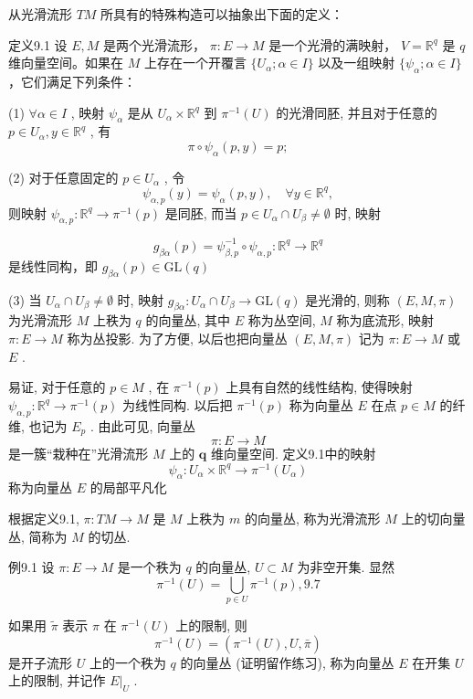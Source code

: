 从光滑流形  $TM$  所具有的特殊构造可以抽象出下面的定义：

定义9.1 设  $E, M$  是两个光滑流形， $\pi : E \to M$  是一个光滑的满映射， $V = \mathbb{R}^q$  是  $q$  维向量空间。如果在  $M$  上存在一个开覆言  $\{U_\alpha; \alpha \in I\}$  以及一组映射  $\{\psi_\alpha; \alpha \in I\}$ ，它们满足下列条件：

(1)  $\forall \alpha \in I$ , 映射  $\psi_{\alpha}$  是从  $U_{\alpha} \times \mathbb{R}^{q}$  到  $\pi^{-1}(U)$  的光滑同胚, 并且对于任意的  $p \in U_{\alpha}, y \in \mathbb{R}^{q}$ , 有
$$
\pi \circ \psi_ {\alpha} (p, y) = p;
$$

(2) 对于任意固定的  $p \in U_{\alpha}$ , 令
$$
\psi_ {\alpha , p} (y) = \psi_ {\alpha} (p, y), \quad \forall y \in \mathbb {R} ^ {q},
$$
则映射  $\psi_{\alpha ,p}:\mathbb{R}^q\to \pi^{-1}(p)$  是同胚, 而当  $p\in U_{\alpha}\cap U_{\beta}\neq \emptyset$  时, 映射

$$
g _ {\beta \alpha} (p) = \psi_ {\beta , p} ^ {- 1} \circ \psi_ {\alpha , p}: \mathbb {R} ^ {q} \rightarrow \mathbb {R} ^ {q}
$$
是线性同构，即  $g_{\beta \alpha}(p)\in \mathrm{GL}(q)$

(3) 当  $U_{\alpha} \cap U_{\beta} \neq \emptyset$  时, 映射  $g_{\beta \alpha}: U_{\alpha} \cap U_{\beta} \to \mathrm{GL}(q)$  是光滑的, 则称  $(E, M, \pi)$  为光滑流形  $M$  上秩为  $q$  的向量丛, 其中  $E$  称为丛空间,  $M$  称为底流形, 映射  $\pi: E \to M$  称为丛投影. 为了方便, 以后也把向量丛  $(E, M, \pi)$  记为  $\pi: E \to M$  或  $E$ .

易证, 对于任意的  $p \in M$ , 在  $\pi^{-1}(p)$  上具有自然的线性结构, 使得映射  $\psi_{\alpha, p}: \mathbb{R}^q \to \pi^{-1}(p)$  为线性同构. 以后把  $\pi^{-1}(p)$  称为向量丛  $E$  在点  $p \in M$  的纤维, 也记为  $E_p$ . 由此可见, 向量丛
$$
\pi : E \rightarrow M
$$
是一簇“栽种在”光滑流形  $M$  上的  $\pmb{q}$  维向量空间. 定义9.1中的映射
$$
\psi_ {\alpha}: U _ {\alpha} \times \mathbb {R} ^ {q} \rightarrow \pi^ {- 1} (U _ {\alpha})
$$
称为向量丛  $E$  的局部平凡化

根据定义9.1,  $\pi : TM \to M$  是  $M$  上秩为  $m$  的向量丛, 称为光滑流形  $M$  上的切向量丛, 简称为  $M$  的切丛.

例9.1 设  $\pi : E \to M$  是一个秩为  $q$  的向量丛,  $U \subset M$  为非空开集. 显然
$$
\pi^ {- 1} (U) = \bigcup_ {p \in U} \pi^ {- 1} (p),  {9.7}
$$

如果用  $\tilde{\pi}$  表示  $\pi$  在  $\pi^{-1}(U)$  上的限制, 则
$$
\pi^ {- 1} (U) = (\pi^ {- 1} (U), U, \bar {\pi})
$$
是开子流形  $U$  上的一个秩为  $q$  的向量丛 (证明留作练习), 称为向量丛  $E$  在开集  $U$  上的限制, 并记作  $E|_{U}$ .

